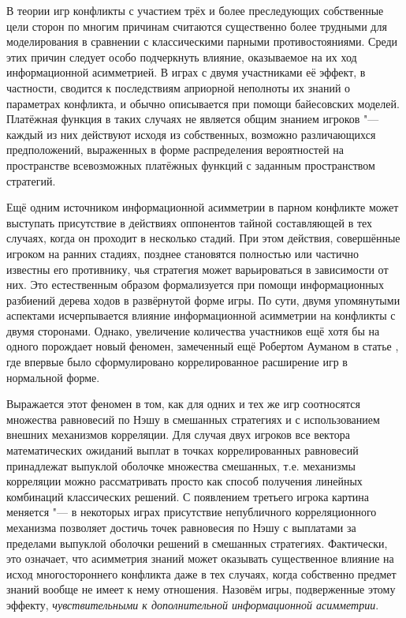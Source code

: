 
{\actuality} В теории игр конфликты с участием трёх и более преследующих собственные цели сторон по многим причинам считаются существенно более трудными для моделирования в сравнении с классическими парными противостояниями. Среди этих причин следует особо подчеркнуть влияние, оказываемое на их ход информационной асимметрией. В играх с двумя участниками её эффект, в частности, сводится к последствиям априорной неполноты их знаний о параметрах конфликта, и обычно описывается при помощи байесовских моделей. Платёжная функция в таких случаях не является общим знанием игроков "--- каждый из них действуют исходя из собственных, возможно различающихся предположений, выраженных в форме распределения вероятностей на пространстве всевозможных платёжных функций с заданным пространством стратегий.

Ещё одним источником информационной асимметрии в парном конфликте может выступать присутствие в действиях оппонентов тайной составляющей в тех случаях, когда он проходит в несколько стадий. При этом действия, совершённые игроком на ранних стадиях, позднее становятся полностью или частично известны его противнику, чья стратегия может варьироваться в зависимости от них. Это естественным образом формализуется при помощи информационных разбиений дерева ходов в развёрнутой форме игры. По сути, двумя упомянутыми аспектами исчерпывается влияние информационной асимметрии на конфликты с двумя сторонами. Однако, увеличение количества участников ещё хотя бы на одного порождает новый феномен, замеченный ещё Робертом Ауманом в статье \cite{Aumann74}, где впервые было сформулировано коррелированное расширение игр в нормальной форме.

Выражается этот феномен в том, как для одних и тех же игр соотносятся множества равновесий по Нэшу в смешанных стратегиях и с использованием внешних механизмов корреляции. Для случая двух игроков все вектора математических ожиданий выплат в точках коррелированных равновесий принадлежат выпуклой оболочке множества смешанных, т.\:е. механизмы корреляции можно рассматривать просто как способ получения линейных комбинаций классических решений. С появлением третьего игрока картина меняется "--- в некоторых играх присутствие непубличного корреляционного механизма позволяет достичь точек равновесия по Нэшу с выплатами за пределами выпуклой оболочки решений в смешанных стратегиях. Фактически, это означает, что асимметрия знаний может оказывать существенное влияние на исход многостороннего конфликта даже в тех случаях, когда собственно предмет знаний вообще не имеет к нему отношения. Назовём игры, подверженные этому эффекту, \emph{чувствительными к дополнительной информационной асимметрии}.

